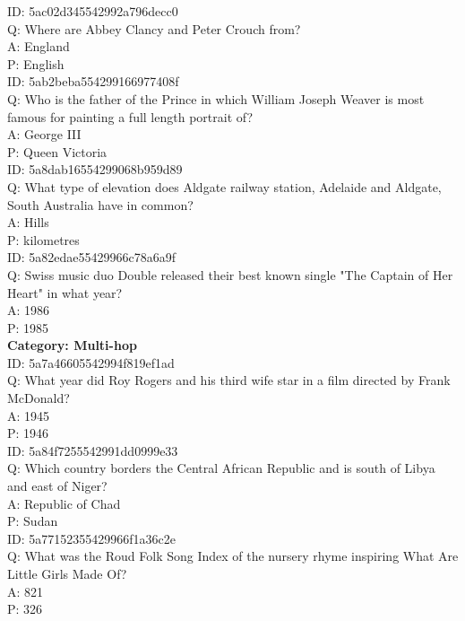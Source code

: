 \documentclass[11pt,a4paper]{article}
\begin{document}
\noindent ID: 5ac02d345542992a796decc0 \\
\noindent Q: Where are Abbey Clancy and Peter Crouch from? \\ 
\noindent A: England \\
\noindent P: English \\

\noindent ID: 5ab2beba554299166977408f \\
\noindent Q: Who is the father of the Prince in which William Joseph Weaver is most famous for painting a full length portrait of? \\
\noindent A: George III \\
\noindent P: Queen Victoria \\

\noindent ID: 5a8dab16554299068b959d89 \\
\noindent Q: What type of elevation does Aldgate railway station, Adelaide and Aldgate, South Australia have in common? \\
\noindent A: Hills \\
\noindent P: kilometres \\

\noindent ID: 5a82edae55429966c78a6a9f \\
\noindent Q: Swiss music duo Double released their best known single "The Captain of Her Heart" in what year? \\
\noindent A: 1986 \\
\noindent P: 1985 \\

\noindent \textbf{Category: Multi-hop} \\
\noindent ID: 5a7a46605542994f819ef1ad \\
\noindent Q: What year did Roy Rogers and his third wife star in a film directed by Frank McDonald? \\
\noindent A: 1945 \\
\noindent P: 1946 \\

\noindent ID: 5a84f7255542991dd0999e33 \\
\noindent Q: Which country borders the Central African Republic and is south of Libya and east of Niger? \\
\noindent A: Republic of Chad \\
\noindent P: Sudan \\

\noindent ID: 5a77152355429966f1a36c2e \\
\noindent Q: What was the Roud Folk Song Index of the nursery rhyme inspiring What Are Little Girls Made Of? \\
\noindent A: 821 \\
\noindent P: 326 \\
\end{document}
